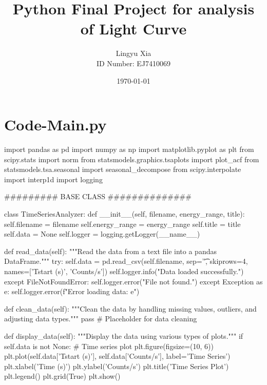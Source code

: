 \documentclass[nofootinbib,aps]{revtex4}
\begin{document}
\title{Python Final Project for analysis of Light Curve}
\date{\today}
\author{Lingyu Xia\\ID Number: EJ7410069}


\maketitle

\section{Code-Main.py}


\begin{framed}
\begin{pythoncode}[caption={main.py code}]
    import pandas as pd
    import numpy as np
    import matplotlib.pyplot as plt
    from scipy.stats import norm
    from statsmodels.graphics.tsaplots import plot_acf
    from statsmodels.tsa.seasonal import seasonal_decompose
    from scipy.interpolate import interp1d
    import logging


    ######### BASE CLASS ##############

    class TimeSeriesAnalyzer:
    def __init__(self, filename, energy_range, title):
        self.filename = filename
        self.energy_range = energy_range
        self.title = title
        self.data = None
        self.logger = logging.getLogger(__name__)

    def read_data(self):
        """Read the data from a text file into a pandas DataFrame."""
        try:
            self.data = pd.read_csv(self.filename, sep='\t', skiprows=4, names=['Tstart (s)', 'Counts/s'])
            self.logger.info("Data loaded successfully.")
        except FileNotFoundError:
            self.logger.error("File not found.")
        except Exception as e:
            self.logger.error(f"Error loading data: {e}")

    def clean_data(self):
        """Clean the data by handling missing values, outliers, and adjusting data types."""
        pass  # Placeholder for data cleaning

    def display_data(self):
        """Display the data using various types of plots."""
        if self.data is not None:
            # Time series plot
            plt.figure(figsize=(10, 6))
            plt.plot(self.data['Tstart (s)'], self.data['Counts/s'], label='Time Series')
            plt.xlabel('Time (s)')
            plt.ylabel('Counts/s')
            plt.title('Time Series Plot')
            plt.legend()
            plt.grid(True)
            plt.show()


\end{pythoncode}
\end{framed}
\end{document}
